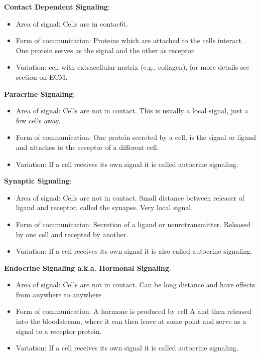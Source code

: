\documentclass[../main.tex]{subfiles}
\begin{document}
\textbf{Contact Dependent Signaling}:
\begin{itemize}
	\item Area of signal: Cells are in contac6t.
	\item Form of communication: Proteins which are attached to the cells interact. One protein serves as the signal and the other as receptor.
	\item Variation: cell with extracellular matrix (e.g., collagen), for more details see section on ECM.
\end{itemize}


\textbf{Paracrine Signaling}:
\begin{itemize}
	\item Area of signal: Cells are not in contact. This is usually a local signal, just a few cells away.
	\item Form of communication: One protein secreted by a cell, is the signal or ligand and attaches to the receptor of a different cell.
	\item Variation: If a cell receives its own signal it is called autocrine signaling.
\end{itemize}


\textbf{Synaptic Signaling}:
\begin{itemize}
	\item Area of signal: Cells are not in contact. Small distance between releaser of ligand and receptor, called the synapse. Very local signal.
	\item Form of communication: Secretion of a ligand or neurotransmitter. Released by one cell and recepted by another.
	\item Variation: If a cell receives its own signal it is also called autocrine signaling.
\end{itemize}


\textbf{Endocrine Signaling a.k.a. Hormonal Signaling}:
\begin{itemize}
	\item Area of signal: Cells are not in contact. Can be long distance and have effects from anywhere to anywhere
	\item Form of communication: A hormone is produced by cell A and then released into the bloodstream, where it can then leave at some point and serve as a signal to a receptor protein.
	\item Variation: If a cell receives its own signal it is called autocrine signaling.
\end{itemize}
\end{document}
